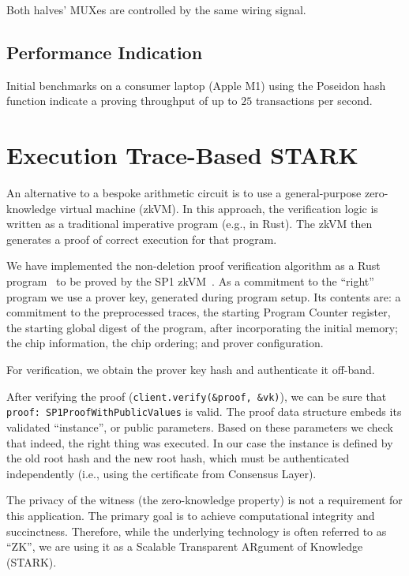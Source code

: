 \documentclass[twocolumn]{article}
\begin{document}
Both halves' MUXes are controlled by the same wiring signal.

\subsection{Performance Indication}

Initial benchmarks on a consumer laptop (Apple M1) using the Poseidon hash function indicate a proving throughput of up to $25$ transactions per second.


\section{Execution Trace-Based STARK}

An alternative to a bespoke arithmetic circuit is to use a general-purpose zero-knowledge virtual machine (zkVM). In this approach, the verification logic is written as a traditional imperative program (e.g., in Rust). The zkVM then generates a proof of correct execution for that program.

We have implemented the non-deletion proof verification algorithm as a Rust program~\cite{stark} to be proved by the SP1 zkVM~\cite{sp1}. As a commitment to the ``right'' program we use a prover key, generated during program setup. Its contents are: a commitment to the preprocessed traces, the starting Program Counter register, the starting global digest of the program, after incorporating the initial memory; the chip information, the chip ordering; and prover configuration.

For verification, we obtain the prover key hash and authenticate it off-band.

After verifying the proof (\lstinline|client.verify(&proof, &vk)|), we can be sure that \lstinline|proof: SP1ProofWithPublicValues| is valid. The proof data structure embeds its validated ``instance'', or public parameters. Based on these parameters we check that indeed, the right thing was executed. In our case the instance is defined by the old root hash and the new root hash, which must be authenticated independently (i.e., using the certificate from Consensus Layer).

The privacy of the witness (the zero-knowledge property) is not a requirement for this application. The primary goal is to achieve computational integrity and succinctness. Therefore, while the underlying technology is often referred to as ``ZK'', we are using it as a Scalable Transparent ARgument of Knowledge (STARK).
\end{document}
